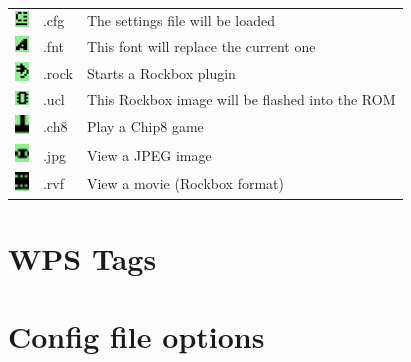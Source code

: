 \begin{center}
\begin{tabularx}{\textwidth}{llX}
\includegraphics[width=0.37cm]{appendix/images/icon-config.png} & .cfg & The settings file will be loaded\\
\includegraphics[width=0.37cm]{appendix/images/icon-font.png} & .fnt & This font will replace the current one\\
\includegraphics[width=0.37cm]{appendix/images/icon-rock.png} & .rock & Starts a Rockbox plugin\\
\includegraphics[width=0.37cm]{appendix/images/icon-ucl.png} & .ucl & This Rockbox image will be flashed into the ROM \\
\includegraphics[width=0.37cm]{appendix/images/icon-chip8.png} & .ch8 & Play a Chip8 game \\
\includegraphics[width=0.37cm]{appendix/images/icon-image-file.png} & .jpg & View a JPEG image \\
\includegraphics[width=0.37cm]{appendix/images/icon-movie-file.png} & .rvf & View a movie (Rockbox format)\\\bottomrule
\end{tabularx}
\end{center}

\chapter{\label{ref:wps_tags}WPS Tags}


\chapter{\label{ref:config_file_options}Config file options}


